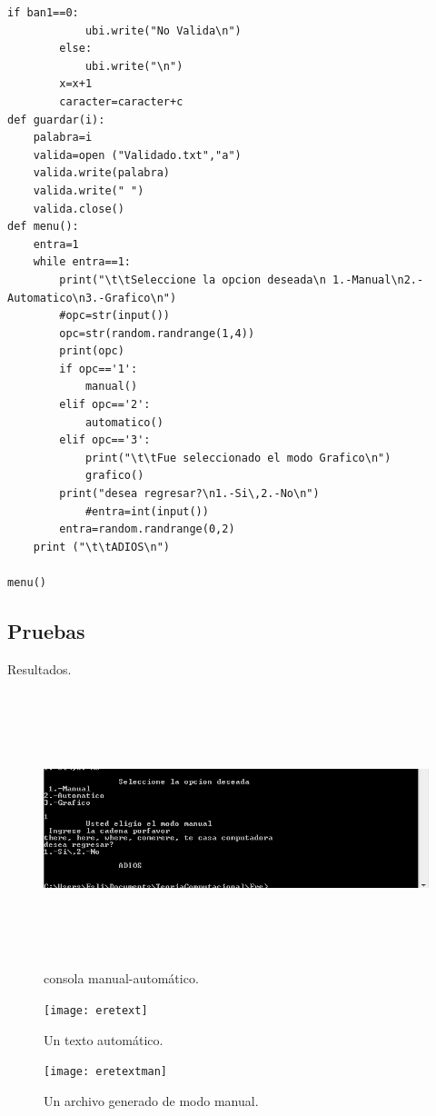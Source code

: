 \documentclass[12pt]{article}
\begin{document}
\begin{lstlisting}[frame=single]
		if ban1==0:
			ubi.write("No Valida\n")
		else:
			ubi.write("\n")
		x=x+1
		caracter=caracter+c
def guardar(i):
	palabra=i
	valida=open ("Validado.txt","a")
	valida.write(palabra)
	valida.write(" ")
	valida.close()
def menu():
	entra=1
	while entra==1:
		print("\t\tSeleccione la opcion deseada\n 1.-Manual\n2.-Automatico\n3.-Grafico\n")
		#opc=str(input())
		opc=str(random.randrange(1,4))
		print(opc)
		if opc=='1':
			manual()
		elif opc=='2':
			automatico()
		elif opc=='3':
			print("\t\tFue seleccionado el modo Grafico\n")
			grafico()
		print("desea regresar?\n1.-Si\,2.-No\n")
			#entra=int(input())
		entra=random.randrange(0,2)
	print ("\t\tADIOS\n")

menu()

\end{lstlisting}

\vspace{1em}


\subsection{Pruebas}
Resultados.

\begin{figure}[H]
\includegraphics[width=\textwidth, height=8cm]{eremanual}
\caption{consola manual-automático.}
\label{fig:autómata -ere}
\end{figure}
\begin{figure}[H]
\texttt{[image: eretext]}
\caption{Un texto automático.}
\label{fig:autómata -ere}
\end{figure}

\begin{figure}[H]
\texttt{[image: eretextman]}
\caption{Un archivo generado de modo manual.}
\label{fig:automata -ere}
\end{figure}
\end{document}
